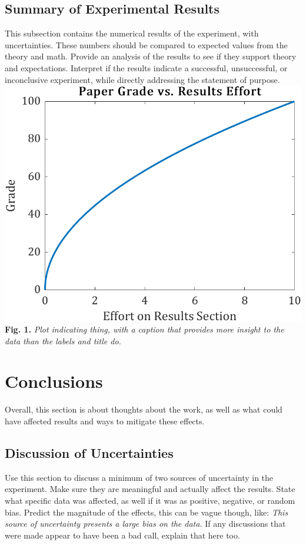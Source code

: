 \documentclass[11pt, letterpaper, notitlepage]{article}
\begin{document}
\begin{multicols}{2}
    \subsection*{Summary of Experimental Results}
    This subsection contains the numerical results of the experiment, with 
    uncertainties. These numbers should be compared to expected values from the theory 
    and math. Provide an analysis of the results to see if they support theory and 
    expectations. Interpret if the results indicate a successful, unsuccessful, or 
    inconclusive experiment, while directly addressing the statement of purpose.\\
  
    
    \noindent\includegraphics[width=\columnwidth]{Results1}\\
    \small{\textbf{Fig. 1.} \emph{Plot indicating thing, with a caption that provides 
    more insight to the data than the labels and title do.}}

    \section*{Conclusions}
    Overall, this section is about thoughts about the work, as well as what could have 
    affected results and ways to mitigate these effects.

    \subsection*{Discussion of Uncertainties}
    Use this section to discuss a minimum of two sources of uncertainty in the 
    experiment. Make sure they are meaningful and actually affect the results. State 
    what specific data was affected, as well if it was as positive, negative, or 
    random bias. Predict the magnitude of the effects, this can be vague though, like: 
    \emph{This source of uncertainty presents a large bias on the data.} If any 
    discussions that were made appear to have been a bad call, explain that here too.
    

\end{multicols}
\end{document}
